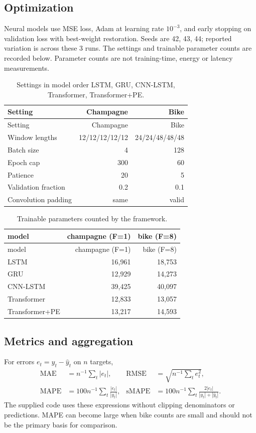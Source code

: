 \documentclass[10pt,a4paper]{article}
\begin{document}
\subsection{Optimization}
Neural models use MSE loss, Adam at learning rate $10^{-3}$, and early stopping on validation loss with best-weight restoration. Seeds are 42, 43, 44; reported variation is across these 3 runs. The settings and trainable parameter counts are recorded below. Parameter counts are not training-time, energy or latency measurements.
\begin{center}\begingroup\footnotesize\setlength{\tabcolsep}{3pt}\begin{longtable}{@{}lrr@{}}\caption{Settings in model order LSTM, GRU, CNN-LSTM, Transformer, Transformer+PE.}\\\toprule Setting & Champagne & Bike\\\midrule\endfirsthead\toprule Setting & Champagne & Bike\\\midrule\endhead Window lengths & 12/12/12/12/12 & 24/24/48/48/48 \\
Batch size & 4 & 128 \\
Epoch cap & 300 & 60 \\
Patience & 20 & 5 \\
Validation fraction & 0.2 & 0.1 \\
Convolution padding & same & valid \\\bottomrule\end{longtable}\endgroup\end{center}
\begin{center}\begingroup\footnotesize\setlength{\tabcolsep}{3pt}\begin{longtable}{@{}lrr@{}}\caption{Trainable parameters counted by the framework.}\\\toprule model & champagne (F=1) & bike (F=8)\\\midrule\endfirsthead\toprule model & champagne (F=1) & bike (F=8)\\\midrule\endhead LSTM & 16,961 & 18,753 \\
GRU & 12,929 & 14,273 \\
CNN-LSTM & 39,425 & 40,097 \\
Transformer & 12,833 & 13,057 \\
Transformer+PE & 13,217 & 14,593 \\\bottomrule\end{longtable}\endgroup\end{center}

\subsection{Metrics and aggregation}
For errors $e_t=y_t-\hat y_t$ on $n$ targets,
\begin{align*}
\mathrm{MAE}&=n^{-1}\sum_t|e_t|,&\mathrm{RMSE}&=\sqrt{n^{-1}\sum_t e_t^2},\\
\mathrm{MAPE}&=100n^{-1}\sum_t\frac{|e_t|}{|y_t|},&\mathrm{sMAPE}&=100n^{-1}\sum_t\frac{2|e_t|}{|y_t|+|\hat y_t|}.
\end{align*}
The supplied code uses these expressions without clipping denominators or predictions. MAPE can become large when bike counts are small and should not be the primary basis for comparison.
\end{document}
